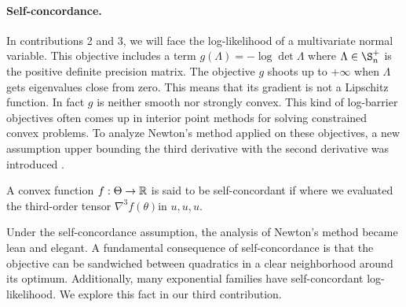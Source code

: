 \paragraph{Self-concordance.}
In contributions 2 and 3, we will face the log-likelihood of a multivariate normal variable.
This objective includes a term $g(\Lambda) = -\log \det \Lambda$ where $\Lambda\in \S_n^+$ is the positive definite precision matrix.
The objective $g$ shoots up to $+\infty$ when $\Lambda$ gets eigenvalues close from zero.
This means that its gradient is not a Lipschitz function.
In fact  $g$ is neither smooth nor strongly convex.
This kind of log-barrier objectives often comes up in interior point methods for solving constrained convex problems.
To analyze Newton's method applied on these objectives, a new assumption upper bounding the third derivative with the second derivative was introduced \citep{nemirovski1983problem}.
\begin{definition}
	\citep[definition 4.1.1]{nesterov2004Intro}
	A convex function $f:\Theta \rightarrow\mathbb{R}$ is said to be self-concordant if
	where we evaluated the third-order tensor $\nabla^3 f(\theta)$in $u,u,u$.
\end{definition}
Under the self-concordance assumption, the analysis of Newton's method became lean and elegant. A fundamental consequence of self-concordance is that the objective can be sandwiched between quadratics in a clear neighborhood around its optimum. Additionally, many exponential families have self-concordant log-likelihood. We explore this fact in our third contribution.


